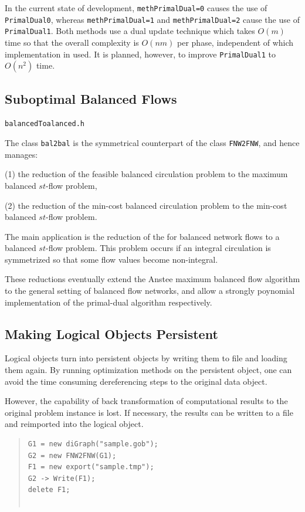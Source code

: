 \documentclass[a4paper,11pt,twoside]{book}
\begin{document}
\begin{multicols}{2}
In the current state of development, \verb/methPrimalDual=0/ causes the use
of \verb/PrimalDual0/, whereas \verb/methPrimalDual=1/ and
\verb/methPrimalDual=2/ cause the use of \verb/PrimalDual1/. Both methods
use a dual update technique which takes $O(m)$ time so that the overall
complexity is $O(nm)$ per phase, independent of which implementation in used.
It is planned, however, to improve \verb/PrimalDual1/ to $O(n^2)$ time.


\subsection{Suboptimal Balanced Flows}
\myinclude\verb/balancedToalanced.h/

\bigskip\noindent
The class \verb/bal2bal/ is the symmetrical counterpart of the class \verb/FNW2FNW/,
and hence manages:
\begin{myitemize}
\item[(1)] the reduction of the feasible balanced circulation problem
    to the maximum balanced $st$-flow problem,
\item[(2)] the reduction of the min-cost balanced circulation problem
    to the min-cost balanced $st$-flow problem.
\end{myitemize}
The main application is the reduction of the 
for balanced network flows to a balanced $st$-flow problem. This problem occurs
if an integral circulation is symmetrized so that some flow values become
non-integral.

These reductions eventually extend the Anstee maximum balanced flow algorithm
to the general setting of balanced flow networks, and allow a strongly
poynomial implementation of the primal-dual algorithm respectively.


\subsection{Making Logical Objects Persistent}

Logical objects turn into persistent objects by writing them to file and
loading them again. By running optimization methods on the persistent object,
one can avoid the time consuming dereferencing steps to the original data
object.

However, the capability of back transformation of computational results to the
original problem instance is lost. If necessary, the results can be written
to a file and reimported into the logical object. 
\sample
\begin{quote}
\begin{verbatim}
G1 = new diGraph("sample.gob");
G2 = new FNW2FNW(G1);
F1 = new export("sample.tmp");
G2 -> Write(F1);
delete F1;


\end{verbatim}
\end{quote}
\end{multicols}
\end{document}
